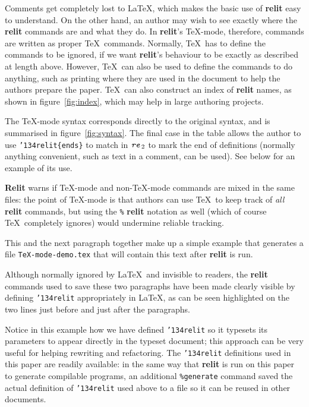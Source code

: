 \documentclass[12pt]{article}
\def\name#1{\textbf{#1}}
\def\seen{{\tt\char'134}seen\{\}}%
\begin{document}
Comments get completely lost to \LaTeX, which makes the basic use of \name{relit} easy to understand. On the other hand, an author may wish to see exactly where the \name{relit} commands are and what they do. In \name{relit}'s \TeX-mode, therefore, commands are written as proper \TeX\ commands. Normally, \TeX\ has to define the commands to be ignored, if we want \name{relit}'s behaviour to be exactly as described at length above. However, \TeX\ can also be used to define the commands to do anything, such as printing where they are used in the document to help the authors prepare the paper. \TeX\ can also construct an index of \name{relit} names, as shown in figure~\ref{fig:index}, which may help in large authoring projects.

The \TeX-mode syntax corresponds directly to the original syntax, and is summarised in figure~\ref{fig:syntax}. The final case in the table allows the author to use \texttt{\char'134relit\{ends\}} to match in $\mbox{\tt \emph{re}}_2$ to mark the end of definitions (normally anything convenient, such as text in a comment, can be used). See below for an example of its use.


\name{Relit} warns if \TeX-mode and non-\TeX-mode commands are mixed in the same files: the point of \TeX-mode is that authors can use \TeX\ to keep track of \emph{all\/} \name{relit} commands, but using the \texttt{\%} \name{relit} notation as well (which of course \TeX\ completely ignores) would undermine reliable tracking.

\relit[\seen{}]{generate TeX-mode-demo.tex ., /relit.ends/-1}\label{tex-mode-example}
\indent This and the next paragraph together make up a simple example that generates a file \texttt{TeX-mode-demo.tex} that will contain this text after \name{relit} is run. 

Although normally ignored by \LaTeX\ and invisible to readers, the \name{relit} commands used to save these two paragraphs have been made clearly visible by defining {\tt \char'134relit} appropriately in \LaTeX, as can be seen highlighted on the two lines just before and just after the paragraphs.

Notice in this example how we have defined \texttt{{\char'134}relit} so it typesets its parameters to appear directly in the typeset document; this approach can be very useful for helping rewriting and refactoring. The \texttt{{\char'134}relit} definitions used in this paper are readily available: in the same way that \name{relit} is run on this paper to generate compilable programs, an additional \texttt{\%{}generate} command saved the actual definition of \texttt{{\char'134}relit} used above to a file so it can be reused in other documents.
\end{document}
